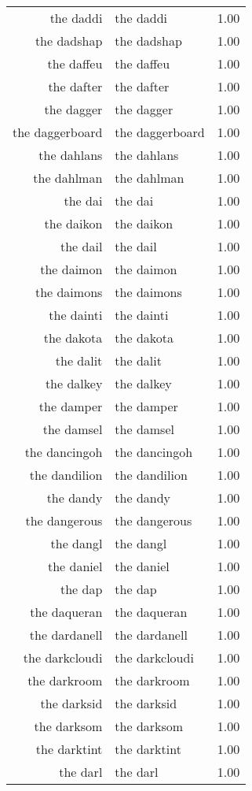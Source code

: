 \begin{table}[ht]
\begin{tabular}{rlr}
  the daddi & the daddi & 1.00 \\ 
  the dadshap & the dadshap & 1.00 \\ 
  the daffeu & the daffeu & 1.00 \\ 
  the dafter & the dafter & 1.00 \\ 
  the dagger & the dagger & 1.00 \\ 
  the daggerboard & the daggerboard & 1.00 \\ 
  the dahlans & the dahlans & 1.00 \\ 
  the dahlman & the dahlman & 1.00 \\ 
  the dai & the dai & 1.00 \\ 
  the daikon & the daikon & 1.00 \\ 
  the dail & the dail & 1.00 \\ 
  the daimon & the daimon & 1.00 \\ 
  the daimons & the daimons & 1.00 \\ 
  the dainti & the dainti & 1.00 \\ 
  the dakota & the dakota & 1.00 \\ 
  the dalit & the dalit & 1.00 \\ 
  the dalkey & the dalkey & 1.00 \\ 
  the damper & the damper & 1.00 \\ 
  the damsel & the damsel & 1.00 \\ 
  the dancingoh & the dancingoh & 1.00 \\ 
  the dandilion & the dandilion & 1.00 \\ 
  the dandy & the dandy & 1.00 \\ 
  the dangerous & the dangerous & 1.00 \\ 
  the dangl & the dangl & 1.00 \\ 
  the daniel & the daniel & 1.00 \\ 
  the dap & the dap & 1.00 \\ 
  the daqueran & the daqueran & 1.00 \\ 
  the dardanell & the dardanell & 1.00 \\ 
  the darkcloudi & the darkcloudi & 1.00 \\ 
  the darkroom & the darkroom & 1.00 \\ 
  the darksid & the darksid & 1.00 \\ 
  the darksom & the darksom & 1.00 \\ 
  the darktint & the darktint & 1.00 \\ 
  the darl & the darl & 1.00 \\ 

\end{tabular}
\end{table}

